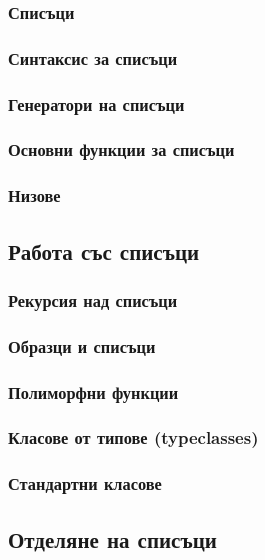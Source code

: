 \documentclass{beamer}
\begin{document}
\begin{frame}
  \frametitle{Списъци}
  
\end{frame}

\begin{frame}
  \frametitle{Синтаксис за списъци}
  
\end{frame}

\begin{frame}
  \frametitle{Генератори на списъци}
  
\end{frame}

\begin{frame}
  \frametitle{Основни функции за списъци}
\end{frame}

\begin{frame}
  \frametitle{Низове}
  
\end{frame}

\subsection{Работа със списъци}

\begin{frame}
  \frametitle{Рекурсия над списъци}
\end{frame}

\begin{frame}
  \frametitle{Образци и списъци}
  
\end{frame}

\begin{frame}
  \frametitle{Полиморфни функции}
\end{frame}

\begin{frame}
  \frametitle{Класове от типове (typeclasses)}
  
\end{frame}

\begin{frame}
  \frametitle{Стандартни класове}
  
\end{frame}

\subsection{Отделяне на списъци}
\end{document}
